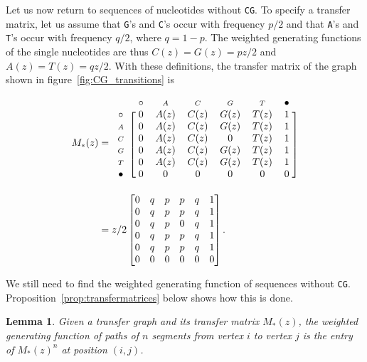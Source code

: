 \documentclass{article}
\newtheorem{lemma}{Lemma}
\newcommand{\smA}{\scriptstyle{A}}
\newcommand{\smC}{\scriptstyle{C}}
\newcommand{\smG}{\scriptstyle{G}}
\newcommand{\smT}{\scriptstyle{T}}
\begin{document}
Let us now return to sequences of nucleotides without \texttt{CG}. To
specify a transfer matrix, let us assume that \texttt{G}'s and
\texttt{C}'s occur with frequency $p/2$ and that \texttt{A}'s and
\texttt{T}'s occur with frequency $q/2$, where $q = 1-p$. The weighted
generating functions of the single nucleotides are thus $C(z) = G(z) =
pz/2$ and $A(z) = T(z) = qz/2$. With these definitions, the transfer
matrix of the graph shown in figure~\ref{fig:CG_transitions} is

\begin{align*}
M_*(z) &=
\begin{blockarray}{ccccccc}
     & \; \circ & \smA & \smC & \smG & \smT & \bullet \; \\
\begin{block}{c[cccccc]}
\circ    & \; 0 & A(z) & C(z) & G(z) & T(z) & 1 \; \\
\smA     & \; 0 & A(z) & C(z) & G(z) & T(z) & 1 \; \\
\smC     & \; 0 & A(z) & C(z) &  0   & T(z) & 1 \; \\
\smG     & \; 0 & A(z) & C(z) & G(z) & T(z) & 1 \; \\
\smT     & \; 0 & A(z) & C(z) & G(z) & T(z) & 1 \; \\
\bullet  & \; 0 &  0   &   0  &   0  &   0  & 0 \; \\
\end{block}
\end{blockarray} \\
&= 
z/2 
\begin{bmatrix}
0 & q & p & p & q & 1 \\
0 & q & p & p & q & 1 \\
0 & q & p & 0 & q & 1 \\
0 & q & p & p & q & 1 \\
0 & q & p & p & q & 1 \\
0 & 0 & 0 & 0 & 0 & 0
\end{bmatrix}.
\end{align*}

We still need to find the weighted generating function of sequences
without \texttt{CG}. Proposition~\ref{prop:transfermatrices} below shows
how this is done.

\begin{lemma}
\label{lemma:transfermatrices}
Given a transfer graph and its transfer matrix $M_*(z)$, the weighted
generating function of paths of $n$ segments from vertex $i$ to vertex $j$
is the entry of $M_*(z)^n$ at position $(i,j)$.
\end{lemma}
\end{document}
